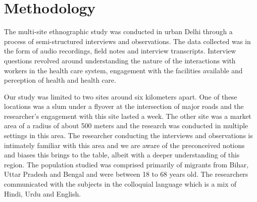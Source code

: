 \section{Methodology}

\begin{comment}
This should tell the story of what you did, and the single most important point is to show that you were reflective, rigorous, ethical, sound in your research. 
Start with where you conducted the study. Was there one site or many? How long was your (the authors’) engagement with this site? What was the nature of the engagement? And remember to anonymize by default.
Say what methods you used and who you studied. How long were your interviews? What kinds of questions did you ask? Did you use an interpreter? Who were these people? How old?
Add a paragraph on who the authors are and what they bring to the table. Say what their biases might have been that could be limitations of this work. Was there access you could not get? 
How did you analyze the data? If you used grounded theory, whose version of grounded theory did you use? Who was responsible for the analysis? 
Finally, there are lots of papers that have a decent write-up for methodology. Find a researcher you like and read up on the Methodology section.
\end{comment}

The multi-site ethnographic study was conducted in urban Delhi through a process of semi-structured interviews and observations. The data collected was in the form of audio recordings, field notes and interview transcripts. Interview questions revolved around understanding the nature of the interactions with workers in the health care system, engagement with the facilities available and perception of health and health care.

Our study was limited to two sites around six kilometers apart. One of these locations was a slum under a flyover at the intersection of major roads and the researcher's engagement with this site lasted a week. The other site was a market area of a radius of about 500 meters and the research was conducted in multiple settings in this area. 
The researcher conducting the interviews and observations is intimately familiar with this area and we are aware of the preconceived notions and biases this brings to the table, albeit with a deeper understanding of this region. The population studied was comprised primarily of migrants from Bihar, Uttar Pradesh and Bengal
and were between 18 to 68 years old. The researchers communicated with the subjects in the colloquial language which is a mix of Hindi, Urdu and English.

